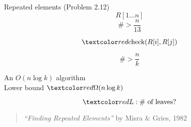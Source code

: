 
\begin{frame}{}
  \begin{exampleblock}{Repeated elements (Problem 2.12)}
    \[
      R[1 \dots n]
    \]
    \[
      \# > \frac{n}{13}
    \]

    \pause
    \[
      \red{\text{check}(R[i], R[j])}
    \]
  \end{exampleblock}
\end{frame}

\begin{frame}{}
  \[
    \# > \frac{n}{k}
  \]

  \pause
  \begin{center}
    An $O(n \log k)$ algorithm \\[15pt] \pause
    Lower bound $\red{\Omega(n \log k)}$
  \end{center}

  \pause
  \[
    \red{L: \# \text{ of leaves} ?}
  \]

  \pause
  \vspace{0.60cm}
  \begin{quote}
    \centering
    {\it ``Finding Repeated Elements''} by Misra \& Gries, 1982
  \end{quote}
\end{frame}
